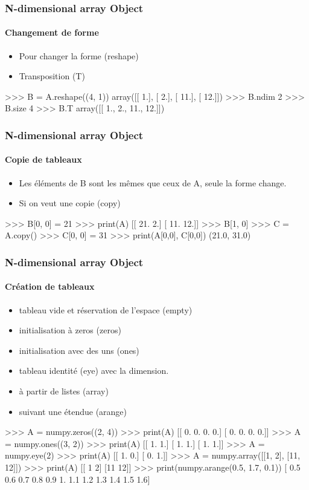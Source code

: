 \begin{frame}[fragile]
\frametitle{N-dimensional array Object}
\framesubtitle{Changement de forme}
\begin{itemize}
 \item Pour changer la forme (reshape)
 \item Transposition (T)
\end{itemize}
\begin{pythonConsole}
>>> B = A.reshape((4, 1))
array([[  1.],
       [  2.],
       [ 11.],
       [ 12.]])
>>> B.ndim
2
>>> B.size
4
>>> B.T
array([[ 1.,   2.,  11.,  12.]])
\end{pythonConsole}
\end{frame}
\begin{frame}[fragile]
\frametitle{N-dimensional array Object}
\framesubtitle{Copie de tableaux}
\begin{itemize}
 \item Les éléments de B sont les mêmes que ceux de A, seule la forme change. 
 \item Si on veut une copie (copy)
\end{itemize}
\begin{pythonConsole}
>>> B[0, 0] = 21
>>> print(A)
[[ 21.   2.]
 [ 11.  12.]]
>>> B[1, 0]
>>> C = A.copy()
>>> C[0, 0] = 31
>>> print(A[0,0], C[0,0])
(21.0, 31.0)
\end{pythonConsole}
\end{frame}
\begin{frame}[fragile]
\frametitle{N-dimensional array Object}
\framesubtitle{Création de tableaux}
\begin{itemize}
 \item tableau vide et réservation de l'espace (empty)
 \item initialisation à zeros (zeros)
 \item initialisation avec des uns (ones)
 \item tableau identité (eye) avec la dimension. 
 \item à partir de listes (array)
 \item suivant une étendue (arange)
\end{itemize}
\begin{pythonConsole}
>>> A = numpy.zeros((2, 4))
>>> print(A)
[[ 0.  0.  0.  0.]
 [ 0.  0.  0.  0.]]
>>> A = numpy.ones((3, 2))
>>> print(A)
[[ 1.  1.]
 [ 1.  1.]
 [ 1.  1.]]
>>> A = numpy.eye(2)
>>> print(A)
[[ 1.  0.]
 [ 0.  1.]]
>>> A = numpy.array([[1, 2], [11, 12]])
>>> print(A)
[[ 1  2]
 [11 12]]
>>> print(numpy.arange(0.5, 1.7, 0.1))
[ 0.5  0.6  0.7  0.8  0.9  1.   1.1  1.2  1.3  1.4  1.5  1.6]
\end{pythonConsole}
\end{frame}
